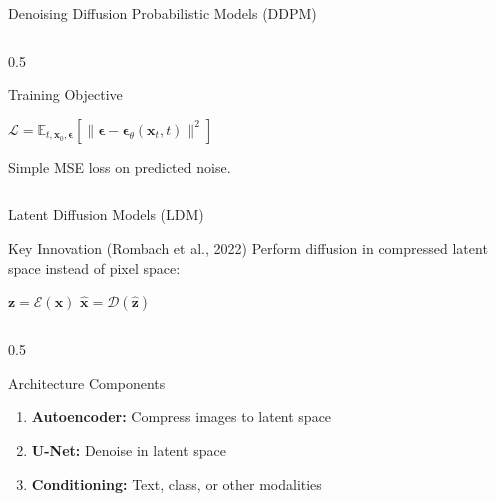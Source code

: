 \documentclass[aspectratio=169]{beamer}
\begin{document}
\begin{frame}{Denoising Diffusion Probabilistic Models (DDPM)}
\begin{columns}
\begin{column}{0.5\textwidth}
            \begin{block}{Training Objective}
                \begin{center}
                    $\mathcal{L} = \mathbb{E}_{t, \mathbf{x}_0, \boldsymbol{\epsilon}}\left[\|\boldsymbol{\epsilon} - \boldsymbol{\epsilon}_\theta(\mathbf{x}_t, t)\|^2\right]$
                \end{center}
                Simple MSE loss on predicted noise.
            \end{block}
        \end{column}
    \end{columns}
\end{frame}

\begin{frame}{Latent Diffusion Models (LDM)}
    \begin{block}{Key Innovation (Rombach et al., 2022)}
        Perform diffusion in compressed latent space instead of pixel space:
        \begin{center}
            $\mathbf{z} = \mathcal{E}(\mathbf{x})$ \hspace{2em} $\hat{\mathbf{x}} = \mathcal{D}(\hat{\mathbf{z}})$
        \end{center}
    \end{block}
    
    \begin{columns}
        \begin{column}{0.5\textwidth}
            \begin{block}{Architecture Components}
                \begin{enumerate}
                    \item \textbf{Autoencoder:} Compress images to latent space
                    \item \textbf{U-Net:} Denoise in latent space
                    \item \textbf{Conditioning:} Text, class, or other modalities
                \end{enumerate}
            \end{block}
            

\end{column}
\end{columns}
\end{frame}
\end{document}
